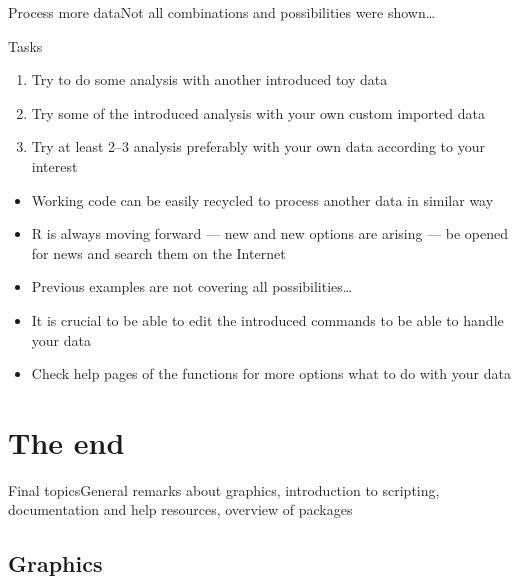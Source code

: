 \documentclass[compress, ucs, xelatex, 11pt, xcolor=svgnames, aspectratio=169,
	hyperref={
		bookmarks=true,
		unicode=true,
		colorlinks=true,
		pdftitle={Molecular data in R},
		plainpages=false,
		pdfauthor={Vojtech Zeisek},
		pdfsubject={Course about phylogeny and evolution in R},
		pdfcreator={XeLaTeX},
		pdfkeywords={R, evolution, phylogeny, molecular data},
		linkcolor=Crimson, %
		anchorcolor=Magenta, %
		citecolor=Magenta, %
		filecolor=Magenta, %
		menucolor=Magenta, %
		urlcolor=DodgerBlue, %
		pdftex},
	url={hyphens, lowtilde} %
	]{beamer}
\begin{document}
\begin{frame}{Process more data}{Not all combinations and possibilities were shown\ldots}
	\begin{exampleblock}{Tasks}
		\begin{enumerate}
			\item Try to do some analysis with another introduced toy data
			\item Try some of the introduced analysis with your own custom imported data
			\item Try at least 2--3 analysis preferably with your own data according to your interest
		\end{enumerate}
	\end{exampleblock}
	\begin{itemize}
		\item Working code can be easily recycled to process another data in similar way
		\item R is always moving forward --- new and new options are arising --- be opened for news and search them on the Internet
		\item Previous examples are not covering all possibilities\ldots
		\item It is crucial to be able to edit the introduced commands to be able to handle your data
		\item Check help pages of the functions for more options what to do with your data
	\end{itemize}
\end{frame}

\section{The end}

\begin{frame}{Final topics}{General remarks about graphics, introduction to scripting, documentation and help resources, overview of packages}
	\tableofcontents[currentsection, sectionstyle=show/hide, hideothersubsections]
\end{frame}

\subsection{Graphics}
\end{document}
